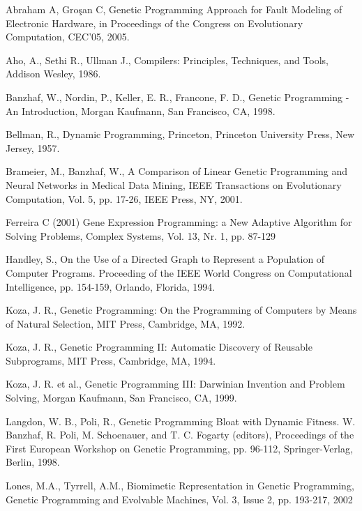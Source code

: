 \begin{thebibliography}{500}


Abraham A, Gro\c san C, Genetic Programming Approach for Fault Modeling of Electronic Hardware, in Proceedings of the Congress on Evolutionary Computation, CEC'05, 2005.

Aho, A., Sethi R., Ullman J., Compilers: Principles, Techniques, and Tools, 
Addison Wesley, 1986.


Banzhaf, W., Nordin, P., Keller, E. R., Francone, F. D., Genetic Programming - An Introduction, Morgan Kaufmann, San Francisco, CA, 1998.


Bellman, R., Dynamic Programming, Princeton, Princeton University Press, New 
Jersey, 1957.


Brameier, M., Banzhaf, W., A Comparison of Linear Genetic Programming and 
Neural Networks in Medical Data Mining, IEEE Transactions on Evolutionary 
Computation, Vol. 5, pp. 17-26, IEEE Press, NY, 2001.


Ferreira C (2001) Gene Expression Programming: a New Adaptive Algorithm for 
Solving Problems, Complex Systems, Vol. 13, Nr. 1, pp. 87-129

Handley, S., On the Use of a Directed Graph to Represent a Population of 
Computer Programs. Proceeding of the IEEE World Congress on Computational 
Intelligence, pp. 154-159, Orlando, Florida, 1994.

Koza, J. R., Genetic Programming: On the Programming of Computers by Means of 
Natural Selection, MIT Press, Cambridge, MA, 1992.

Koza, J. R., Genetic Programming II: Automatic Discovery of Reusable 
Subprograms, MIT Press, Cambridge, MA, 1994.

Koza, J. R. et al., Genetic Programming III: Darwinian Invention and Problem 
Solving, Morgan Kaufmann, San Francisco, CA, 1999.

Langdon, W. B., Poli, R., Genetic Programming Bloat with Dynamic Fitness. 
W. Banzhaf, R. Poli, M. Schoenauer, and T. C. Fogarty (editors), Proceedings 
of the First European Workshop on Genetic Programming, 
pp. 96-112,  Springer-Verlag, Berlin, 1998.

Lones, M.A., Tyrrell, A.M., Biomimetic Representation in Genetic Programming, Genetic Programming and Evolvable Machines, Vol. 3, Issue 2, pp. 193-217, 2002



\end{thebibliography}
